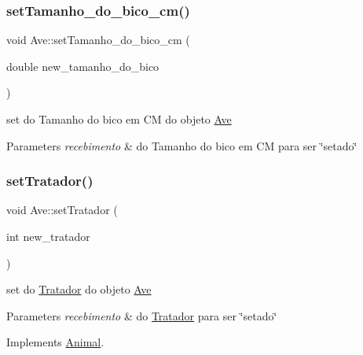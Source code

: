 \mbox{\label{class_ave_ae0d9b554debcbbfde4e6a7315d39f574}} 
\subsubsection{\texorpdfstring{setTamanho\_do\_bico\_cm()}{setTamanho\_do\_bico\_cm()}}
{\footnotesize\ttfamily void Ave\+::set\+Tamanho\+\_\+do\+\_\+bico\+\_\+cm (\begin{DoxyParamCaption}\item[{double}]{new\+\_\+tamanho\+\_\+do\+\_\+bico }\end{DoxyParamCaption})}



set do Tamanho do bico em CM do objeto \mbox{\hyperlink{class_ave}{Ave}} 


\begin{DoxyParams}{Parameters}
{\em recebimento} & do Tamanho do bico em CM para ser \char`\"{}setado\char`\"{} \\
\hline
\end{DoxyParams}
\mbox{\label{class_ave_a15605d35f11972f6275ba9ca6f2813a0}} 
\subsubsection{\texorpdfstring{setTratador()}{setTratador()}}
{\footnotesize\ttfamily void Ave\+::set\+Tratador (\begin{DoxyParamCaption}\item[{int}]{new\+\_\+tratador }\end{DoxyParamCaption})\hspace{0.3cm}{\ttfamily [virtual]}}



set do \mbox{\hyperlink{class_tratador}{Tratador}} do objeto \mbox{\hyperlink{class_ave}{Ave}} 


\begin{DoxyParams}{Parameters}
{\em recebimento} & do \mbox{\hyperlink{class_tratador}{Tratador}} para ser \char`\"{}setado\char`\"{} \\
\hline
\end{DoxyParams}


Implements \mbox{\hyperlink{class_animal}{Animal}}.

